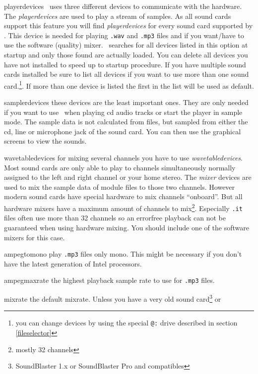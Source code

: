 \begin{dojlist}
\item[playerdevices] \cp\ uses three different devices to communicate with the
hardware. The \emph{playerdevices} are used to play a stream of
samples. As all sound cards support this feature you will find
\emph{playerdevices} for every sound card supported by \cp. This
device is needed for playing
\texttt{.wav} and \texttt{.mp3} files and if you want/have to use the software
(quality) mixer. \cp\ searches for all devices listed in this option
at startup and only those found are actually loaded. You can delete
all devices you have not installed to speed up to startup
procedure. If you have multiple sound cards installed be sure to list
all devices if you want to use more than one sound card.\footnote{you
can change devices by using the special
\texttt{@:} drive described in section \ref{fileselector}}. If more than one
device is listed the first in the list will be used as default.
\item[samplerdevices] these devices are the least important ones. They are
only needed if you want to use \cp\ when playing cd audio tracks or
start the player in sample mode. The sample data is not calculated
from files, but sampled from either the cd, line or microphone jack of
the sound card. You can then use the graphical screens to view the
sounds.
\item[wavetabledevices] for mixing several channels you have to use
\emph{wavetabledevices}. Most sound cards are only able to play to channels
simultaneously normally assigned to the left and right channel or your
home stereo. The \emph{mixer} devices are used to mix the sample data
of module files to those two channels. However modern sound cards have
special hardware to mix channels ``onboard''. But all hardware mixers
have a maximum amount of channels to mix\footnote{mostly 32
channels}. Especially \texttt{.it} files often use more than 32
channels so an errorfree playback can not be guaranteed when using
hardware mixing. You should include one of the software mixers for
this case.
\item[ampegtomono] play \texttt{.mp3} files only mono. This might be necessary
if you don't have the latest generation of Intel processors.
\item[ampegmaxrate] the highest playback sample rate to use for \texttt{.mp3}
files.
\item[mixrate] the default mixrate. Unless you have a very old sound
card\footnote{SoundBlaster 1.x or SoundBlaster Pro and compatibles} or

\end{dojlist}
